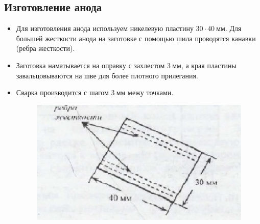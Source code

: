 \documentclass[a4paper]{article}
\begin{document}
\subsection{Изготовление анода}
\begin{itemize}
    \item Для изготовления анода используем никелевую пластину $30 \cdot 40~\text{мм}$. Для большей жесткости анода на заготовке с помощью шила проводятся канавки (ребра жесткости).
    \item Заготовка наматывается на оправку с захлестом $3~\text{мм}$, а края пластины завальцовываются на шве для более плотного прилегания.
    \item Сварка производится с шагом $3~\text{мм}$ межу точками.
\begin{figure}[h]
\begin{center}
\includegraphics[width=13cm]{заготовка анода.jpg}
\end{center}
\end{figure}
\end{itemize}
\end{document}
